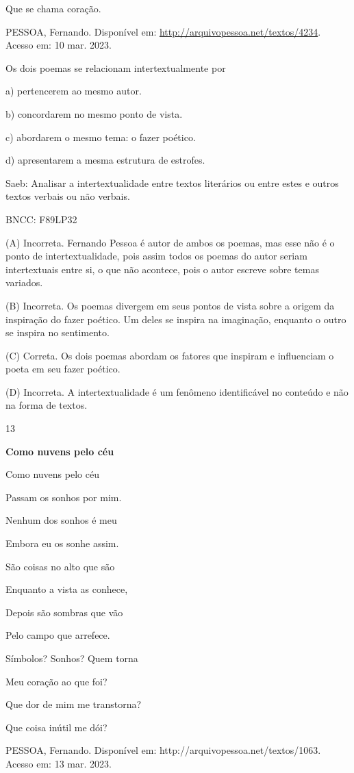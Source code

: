 Que se chama coração.

PESSOA, Fernando. Disponível em:
\url{http://arquivopessoa.net/textos/4234}. Acesso em: 10 mar. 2023.

Os dois poemas se relacionam intertextualmente por

a) pertencerem ao mesmo autor.

b) concordarem no mesmo ponto de vista.

c) abordarem o mesmo tema: o fazer poético.

d) apresentarem a mesma estrutura de estrofes.

Saeb: Analisar a intertextualidade entre textos literários ou entre
estes e outros textos verbais ou não verbais.

BNCC: F89LP32

(A) Incorreta. Fernando Pessoa é autor de ambos os poemas, mas esse não
é o ponto de intertextualidade, pois assim todos os poemas do autor
seriam intertextuais entre si, o que não acontece, pois o autor escreve
sobre temas variados.

(B) Incorreta. Os poemas divergem em seus pontos de vista sobre a origem
da inspiração do fazer poético. Um deles se inspira na imaginação,
enquanto o outro se inspira no sentimento.

(C) Correta. Os dois poemas abordam os fatores que inspiram e
influenciam o poeta em seu fazer poético.

(D) Incorreta. A intertextualidade é um fenômeno identificável no
conteúdo e não na forma de textos.

\num{13}

\textbf{Como nuvens pelo céu}

Como nuvens pelo céu

Passam os sonhos por mim.

Nenhum dos sonhos é meu

Embora eu os sonhe assim.

São coisas no alto que são

Enquanto a vista as conhece,

Depois são sombras que vão

Pelo campo que arrefece.

Símbolos? Sonhos? Quem torna

Meu coração ao que foi?

Que dor de mim me transtorna?

Que coisa inútil me dói?

PESSOA, Fernando. Disponível em: http://arquivopessoa.net/textos/1063.
Acesso em: 13 mar. 2023.

